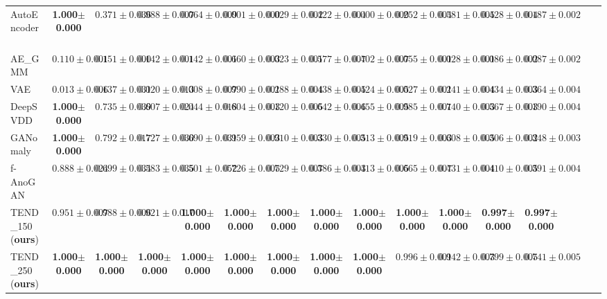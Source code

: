 \documentclass[12pt]{spieman}  %
\begin{document}
\begin{spacing}{2}
\begin{table} [htp]
{\begin{tabular}{|l|cccc|cccc|cccc|cccc|}
AutoEncoder~\cite{mcclelland1986parallel}      & {\textbf{1.000$\pm$0.000}}    & {$0.371\pm0.036$}    & {$0.988\pm0.007$}  & {$0.064\pm0.009$}   & {$0.001\pm0.000$}   & {$0.029\pm0.002$}  & {$0.422\pm0.004$}   & {$0.000\pm0.000$}  & {$0.252\pm0.004$} & {$0.581\pm0.005$} & {$0.428\pm0.004$} & {$0.187\pm0.002$}\\
AE\_GMM    & {$0.110\pm0.001$}     & {$0.151\pm0.000$}   & {$0.142\pm0.001$}  & {$0.142\pm0.001$}   & {$0.660\pm0.003$}   & {$0.023\pm0.001$}  & {$0.577\pm0.007$}   & {$0.402\pm0.007$} & {$0.055\pm0.001$} & {$0.028\pm0.001$} & {$0.086\pm0.002$} & {$0.087\pm0.002$} \\
VAE~\cite{an2015variational:an}      & {$0.013\pm0.006$}    & {$0.137\pm0.031$}   & {$0.020\pm0.013$} & {$0.008\pm0.007$}    & {$0.990\pm0.001$}   & {$0.288\pm0.004$}  & {$0.438\pm0.005$}   & {$0.424\pm0.005$}  & {$0.027\pm0.001$} & {$0.241\pm0.004$} & {$0.434\pm0.003$} & {$0.364\pm0.004$} \\
DeepSVDD~\cite{ruff2018deep:ruff}        & {\textbf{1.000$\pm$0.000}}     & {$0.735\pm0.039$}    & {$0.607\pm0.024$}  & {$0.044\pm0.018$}  & {$ 0.604\pm0.003$}     & {$0.120\pm0.005$}    & {$0.642\pm0.006$}  & {$0.455\pm0.005$}  & {$0.985\pm0.001$}    & {$0.740\pm0.003$}    & {$0.567\pm0.003$}  & {$0.190\pm0.004$} \\
GANomaly~\cite{akcay2018ganomaly:akcay}          & {\textbf{1.000$\pm$0.000}}    & {$0.792\pm0.017$}   & {$0.727\pm0.030$}  & {$0.690\pm0.031$}  & {$0.959\pm0.003$}   & {$0.910\pm0.003$}   & {$0.330\pm0.005$}  & {$0.313\pm0.005$}  &{$0.919\pm0.003$} & {$ 0.608\pm0.005$}& {$0.306\pm0.002$} & {$0.348\pm0.003$}\\
f-AnoGAN~\cite{schlegl2019f}  & {$0.888\pm0.024$}     & {$0.699\pm0.034$}    & {$0.583\pm0.035$}  & {$0.501\pm0.052$}  & {$0.726\pm0.005$} & {$0.729\pm0.007$}  & {$0.386\pm0.003$}  & {$0.413\pm0.005$}  & {$0.665\pm0.007$} & {$0.431\pm0.004$} & {$0.410\pm0.005$}& {$0.391\pm0.004$} \\
\hline
TEND\_150 (\textbf{ours})    & {$0.951\pm0.007$}        & {$0.988\pm0.006$}       & {$0.921\pm0.017$} & {\textbf{1.000$\pm$0.000}}  & {\textbf{1.000$\pm$0.000}}       & {\textbf{1.000$\pm$0.000}}      & {\textbf{1.000$\pm$0.000}}  & {\textbf{1.000$\pm$0.000}}   & {\textbf{1.000$\pm$0.000}}  & {\textbf{1.000$\pm$0.000}} & {\textbf{0.997$\pm$0.000}} & {\textbf{0.997$\pm$0.000}} \\
TEND\_250 (\textbf{ours})    & {\textbf{1.000$\pm$0.000}}       & {\textbf{1.000$\pm$0.000}}       & {\textbf{1.000$\pm$0.000}}  & {\textbf{1.000$\pm$0.000}}   & {\textbf{1.000$\pm$0.000}}      & {\textbf{1.000$\pm$0.000}}     & {\textbf{1.000$\pm$0.000}}   & {\textbf{1.000$\pm$0.000}}   & {$0.996\pm0.001$}  & {$0.942\pm0.003$} & {$0.799\pm0.005$} & {$0.741\pm0.005$} \\ 

\end{tabular}}
\end{table}
\end{spacing}
\end{document}
